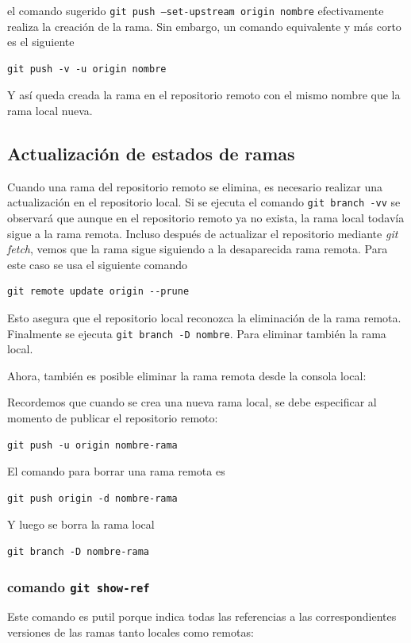 el comando sugerido \texttt{git push --set-upstream origin nombre} efectivamente realiza la creación de la rama. Sin embargo, un comando equivalente y más corto es el siguiente

\begin{verbatim}
git push -v -u origin nombre
\end{verbatim}

Y así queda creada la rama en el repositorio remoto con el mismo nombre que la rama local nueva. 


\subsection{Actualización de estados de ramas}

Cuando una rama del repositorio remoto se elimina, es necesario realizar una actualización en el repositorio local. Si se ejecuta el comando \texttt{git branch -vv} se observará que aunque en el repositorio remoto ya no exista, la rama local todavía sigue a la rama remota. Incluso después de actualizar el repositorio mediante \textit{git fetch}, vemos que la rama sigue siguiendo a la desaparecida rama remota. 
Para este caso se usa el siguiente comando

\begin{verbatim}
git remote update origin --prune
\end{verbatim}
Esto asegura que el repositorio local reconozca la eliminación de la rama remota. Finalmente se ejecuta 
\texttt{git branch -D nombre}. Para eliminar también la rama local.

Ahora, también es posible eliminar la rama remota desde la consola local:

Recordemos que cuando se crea una nueva rama local, se debe especificar al momento de publicar el repositorio remoto:

\begin{verbatim}
git push -u origin nombre-rama
\end{verbatim}
El comando para borrar una rama remota es 

\begin{verbatim}
git push origin -d nombre-rama
\end{verbatim}
Y luego se borra la rama local

\begin{verbatim}
git branch -D nombre-rama
\end{verbatim}

\subsubsection{comando \texttt{git show-ref}} Este comando es putil porque indica todas las referencias a las correspondientes versiones de las ramas tanto locales como remotas:

